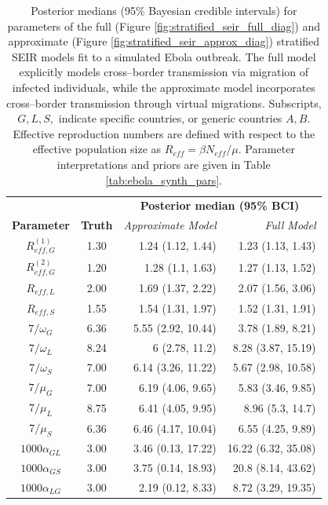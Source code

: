 \begin{table}[htbp]
	\caption[Posterior parameter estimates for full and approximate stratified SEIR models fit to a simulated Ebola outbreak.]{Posterior medians (95\% Bayesian credible intervals) for parameters of the full (Figure \ref{fig:stratified_seir_full_diag}) and approximate (Figure \ref{fig:stratified_seir_approx_diag}) stratified SEIR models fit to a simulated Ebola outbreak. The full model explicitly models cross--border transmission via migration of infected individuals, while the approximate model incorporates cross--border transmission through virtual migrations. Subscripts, $ G,L,S, $ indicate specific countries, or generic countries $ A,B $. Effective reproduction numbers are defined with respect to the effective population size as $ R_{eff} = \beta N_{eff} /\mu $. Parameter interpretations and priors are given in Table \ref{tab:ebola_synth_pars}.}
	\label{tab:ebola_synth_ests}
	\centering\footnotesize
	\begin{tabular}{ccrr}		
		& & \multicolumn{2}{c}{\textbf{Posterior median (95\% BCI)}}\\\cline{3-4}
		\textbf{Parameter} & \textbf{Truth} & \textit{Approximate Model} & \textit{Full Model} \\ 
		\hline
		$ R_{eff,G}^{(1)} $& 1.30 & 1.24 (1.12, 1.44) & 1.23 (1.13, 1.43) \\ 
		$ R_{eff,G}^{(2)} $& 1.20 & 1.28 (1.1, 1.63)& 1.27 (1.13, 1.52) \\ 
		$ R_{eff,L} $& 2.00 & 1.69 (1.37, 2.22) & 2.07 (1.56, 3.06)  \\ 
		$ R_{eff,S} $& 1.55 & 1.54 (1.31, 1.97)& 1.52 (1.31, 1.91) \\ 
		$ 7/\omega_G $& 6.36 & 5.55 (2.92, 10.44)& 3.78 (1.89, 8.21)  \\ 
		$ 7/\omega_L $& 8.24 & 6 (2.78, 11.2)&  8.28 (3.87, 15.19) \\ 
		$ 7/\omega_S $& 7.00 & 6.14 (3.26, 11.22)& 5.67 (2.98, 10.58) \\ 
		$ 7/\mu_G $& 7.00 & 6.19 (4.06, 9.65)& 5.83 (3.46, 9.85) \\ 
		$ 7/\mu_L $ & 8.75 & 6.41 (4.05, 9.95) & 8.96 (5.3, 14.7) \\
		$ 7/\mu_S $& 6.36 & 6.46 (4.17, 10.04)& 6.55 (4.25, 9.89) \\ 
		$ 1000\alpha_{GL} $& 3.00 & 3.46 (0.13, 17.22) & 16.22 (6.32, 35.08) \\ 
		$ 1000\alpha_{GS} $& 3.00 & 3.75 (0.14, 18.93)& 20.8 (8.14, 43.62) \\ 
		$ 1000\alpha_{LG} $& 3.00 & 2.19 (0.12, 8.33)&  8.72 (3.29, 19.35) \\ 

\end{tabular}
\end{table}
